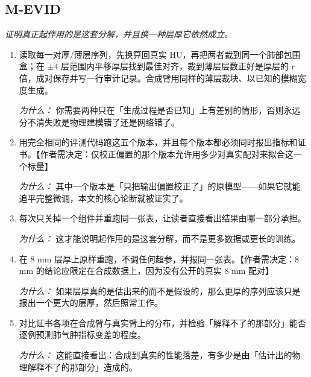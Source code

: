 \documentclass[10pt,a4paper]{article}
\begin{document}
\subsection*{M-EVID}
\emph{证明真正起作用的是这套分解，并且换一种层厚它依然成立。}
\begin{enumerate}[leftmargin=*,start=8]
  \item 读取每一对厚/薄层序列，先换算回真实 HU，再把两者裁到同一个肺部包围盒；在 \(\pm 4\) 层范围内平移厚层找到最佳对齐，裁到薄层层数正好是厚层的 r 倍，成对保存并写一行审计记录。合成臂用同样的薄层裁块、以已知的模糊宽度生成。
\par\emph{为什么：} 你需要两种只在「生成过程是否已知」上有差别的情形，否则永远分不清失败是物理建模错了还是网络错了。
  \item 用完全相同的评测代码跑这五个版本，并且每个版本都必须同时报出指标和证书。【作者需决定：仅校正偏置的那个版本允许用多少对真实配对来拟合这一个标量】
\par\emph{为什么：} 其中一个版本是「只把输出偏置校正了」的原模型------如果它就能追平完整微调，本文的核心论断就被证实了。
  \item 每次只关掉一个组件并重跑同一张表，让读者直接看出结果由哪一部分承担。
\par\emph{为什么：} 这才能说明起作用的是这套分解，而不是更多数据或更长的训练。
  \item 在 8 mm 层厚上原样重跑，不调任何超参，并报同一张表。【作者需决定：8 mm 的结论应限定在合成数据上，因为没有公开的真实 8 mm 配对】
\par\emph{为什么：} 如果层厚真的是估出来的而不是假设的，那么更厚的序列应该只是报出一个更大的层厚，然后照常工作。
  \item 对比证书各项在合成臂与真实臂上的分布，并检验「解释不了的那部分」能否逐例预测肺气肿指标变差的程度。
\par\emph{为什么：} 这能直接看出：合成到真实的性能落差，有多少是由「估计出的物理解释不了的那部分」造成的。
\end{enumerate}
\end{document}
